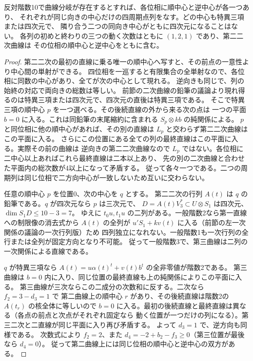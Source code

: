 \begin{corollary}\label{cor:rank-ten-conic-center-cycles}
反対階数10で曲線分岐が存在するとすれば、各位相に順中心と逆中心が各一つあり、
それぞれが同じ向きの中心だけの四周期点列をなす。どの中心も特異三項または四次元で、
隣り合う二つの同向き中心がともに四次元になることはない。
各列の初めと終わりの三つの動く次数はともに $(1,2,1)$ であり、第二二次曲線は
その位相の順中心と逆中心をともに含む。
\end{corollary}
\begin{proof}
第二二次の最初の直線に乗る唯一の順中心へ写すと、その前点の一意性より中心間の単射ができる。
四位相を一巡すると有限集合の全単射なので、各位相に同数の中心があり、全てが次の中心として現れる。
逆向きも同じで、列の始終の対応で両向きの総数は等しい。
前節の二次曲線の鉛筆の議論より現れ得るのは特異三項または四次元で、四次元の直後は特異三項である。
そこで特異三項の順中心 $p$ を一つ選べる。その後続直線の外から来る次の点は
一つの平面 $b=0$ に入る。これは同鉛筆の末尾縮約に含まれる $S_p\otimes kb$ の純関係による。
$p$ と同位相に他の順中心があれば、その別の直線は $L_p$ と交わらず第二二次曲線はこの平面に入る。
さらにこの位置にある全ての列の最終直線はこの平面に入る。実際その前の曲線は
逆向きの第二二次曲線なので $L_p$ ではない。各位相に二中心以上あればこれら最終直線は二本以上あり、
先の別の二次曲線と合わせた平面内の総次数が4以上になって矛盾する。
従って各々一つである。二つの周期列は同じ位相で二方向中心が一致しないため互いに交わらない。

任意の順中心 $p$ を位置0、次の中心を $q$ とする。
第二二次の行列 $A(t)$ は $q$ の鉛筆である。$q$ が四次元なら $p$ は三次元で、
$D=A(t)V_3^*\subset U\otimes S_1$ は四次元、$\dim S_1D\le10-3=7$。
ゆえに $t_0u,t_1u$ の二列がある。一般階数2なら第一直線への制限像の消去式から
$A(t)$ の全列が $u' S_1+kv(t)$ に入る（前節の左一次関係の議論の一次行列版）ため
四列独立になれない。一般階数1も一次行列の全行または全列が固定方向となり不可能。
従って一般階数3で、第三曲線は二列の一次関係による直線である。

$q$ が特異三項なら $A(t)=u\alpha(t)^t+v(t)b^t$ の全非零値が階数2である。
第三曲線は $b=0$ 内に入り、同じ位置の最終直線も上の純関係によりこの平面に入る。
第三曲線が三次ならこの二成分の次数和に反する。二次なら $f_2=3-d_3=1$ で
第二曲線上の順中心 $r$ があり、その後続直線は階数2の $A(t_r)$ の核全体に等しいので
$b=0$ に入る。最初の後続直線と最終直線は異なる（各点の前点と次点がそれぞれ固定なら
動く位置が一つだけの列になる）。第三二次と二直線が同じ平面に入り再び矛盾する。
よって $d_3=1$ で、逆方向も同様である。
次数式により $f_2=2$、また $d_4=-2+b_2-f_3\ge0$（第三位置が最後なら $d_4=0$）。
従って第二曲線上には同じ位相の順中心と逆中心の双方がある。
\end{proof}

